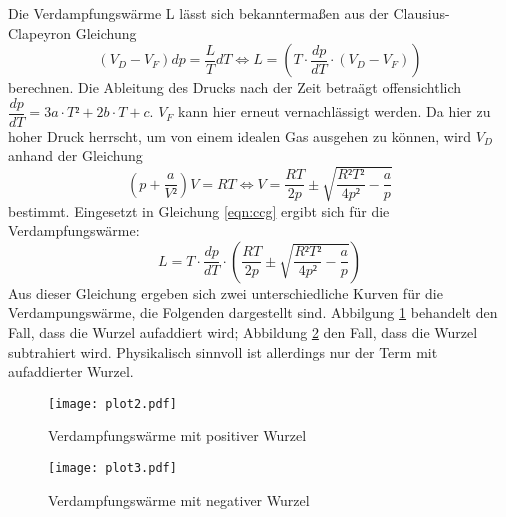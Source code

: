   Die Verdampfungswärme L lässt sich bekanntermaßen aus der Clausius-Clapeyron Gleichung 
  \begin{equation}
    \label{eqn:ccg}
    (V_D-V_F)dp = \dfrac{L}{T}dT \Leftrightarrow L = (T \cdot \dfrac{dp}{dT}\cdot(V_D-V_F)) 
  \end{equation}
  berechnen.
  Die Ableitung des Drucks nach der Zeit betraägt offensichtlich $\dfrac{dp}{dT}= 3a \cdot
  T²+2b\cdot T+ c$. $V_F$ kann hier erneut vernachlässigt werden.
  Da hier zu hoher Druck herrscht, um von einem idealen Gas ausgehen zu können, wird 
  $V_D$ anhand der Gleichung
  \begin{equation*}
  (p+\dfrac{a}{V²})V = RT \Leftrightarrow V = \dfrac{RT}{2p} \pm \sqrt{\dfrac{R²T²}{4p²}-\dfrac{a}{p}}
  \end{equation*}
  bestimmt. Eingesetzt in Gleichung \ref{eqn:ccg} ergibt sich für die Verdampfungswärme:
  \begin{equation*}
  L = T \cdot \dfrac{dp}{dT} \cdot (\dfrac{RT}{2p} \pm \sqrt{\dfrac{R²T²}{4p²}-\dfrac{a}{p}})
  \end{equation*}
  Aus dieser Gleichung ergeben sich zwei unterschiedliche Kurven für die Verdampungswärme, die
  Folgenden dargestellt sind. Abbilgung \ref{fig:plot2} behandelt den Fall, dass die Wurzel aufaddiert wird; 
  Abbildung \ref{fig:plot3} den Fall, dass die Wurzel subtrahiert wird. Physikalisch sinnvoll ist allerdings
  nur der Term mit aufaddierter Wurzel.
  \begin{figure}[H]
   \centering
   \texttt{[image: plot2.pdf]}
   \caption{Verdampfungswärme mit positiver Wurzel}
   \label{fig:plot2}
  \end{figure}
  
  \begin{figure}[H]
   \centering
   \texttt{[image: plot3.pdf]}
   \caption{Verdampfungswärme mit negativer Wurzel}
   \label{fig:plot3}
  \end{figure}

